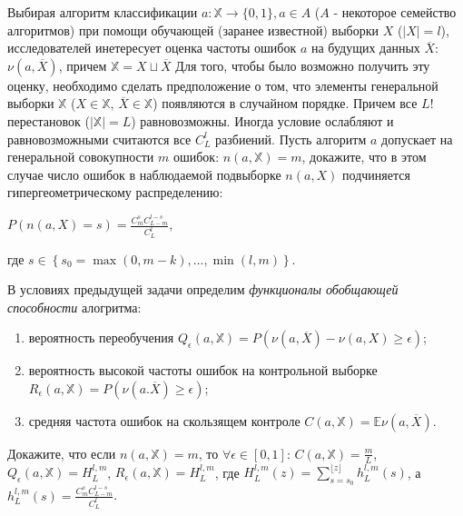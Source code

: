 \begin{problem}
Выбирая алгоритм классификации $a: \mathbb{X} \rightarrow \{0,1\}, a \in A$ ($A$ - некоторое семейство алгоритмов) при помощи обучающей (заранее известной) выборки $X$ ($|X| = l$), исследователей инетересует оценка частоты ошибок $a$ на будущих данных $\overline{X}$: $\nu(a, \overline{X})$, причем $\mathbb{X} =  X \sqcup \overline{X}$ Для того, чтобы было возможно получить эту оценку, необходимо сделать предположение о том, что элементы генеральной выборки $\mathbb{X}$ ($X \in \mathbb{X}$, $\overline{X} \in \mathbb{X}$) появляются в случайном порядке. Причем все $L!$ перестановок ($|\mathbb{X}| = L$) равновозможны. Иногда условие ослабляют и равновозможными считаются все $C_L^l$ разбиений. Пусть алгоритм $a$ допускает на генеральной совокупности $m$ ошибок: $n(a, \mathbb{X}) = m$, докажите, что в этом случае число ошибок в наблюдаемой подвыборке $n(a, X)$ подчиняется гипергеометрическому распределению:
\begin{center}
$P(n(a, X) = s) = \frac{C_m^s C_{L-m}^{l-s}}{C_L^l}$,
\end{center}
где $s\in \left\{s_0 = \max(0, m-k),..., \min(l,m)\right\}$.
\end{problem}

\begin{problem}
В условиях предыдущей задачи определим \textit{функционалы обобщающей способности} алогритма:
\begin{enumerate}
\item вероятность переобучения $Q_{\epsilon}(a, \mathbb{X}) = P(\nu(a, \overline{X}) - \nu(a,X) \geq \epsilon)$;
\item вероятность высокой частоты ошибок на контрольной выборке $R_{\epsilon}(a, \mathbb{X}) = P(\nu(a. \overline{X})\geq \epsilon)$;
\item средняя частота ошибок на скользящем контроле $C(a, \mathbb{X}) = \mathbb{E}\nu(a, \overline{X})$.
\end{enumerate}
Докажите, что если $n(a, \mathbb{X}) = m$, то $\forall \epsilon \in [0, 1]$: $C(a,\mathbb{X}) = \frac{m}{L}$, $Q_{\epsilon}(a, \mathbb{X}) = H_L^{l,m}$, $R_{\epsilon}(a, \mathbb{X}) = H_L^{l,m}$, где $H_L^{l,m}(z) = \sum_{s=s_0}^{\lfloor z \rfloor} h_L^{l, m}(s)$, а $h_L^{l, m}(s) =  \frac{C_m^s C_{L-m}^{l-s}}{C_L^l}$.
\end{problem}

